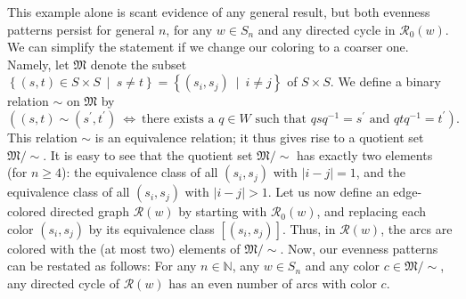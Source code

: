 \documentclass[numbers=enddot,12pt,final,onecolumn,notitlepage,abstracton]{scrartcl}%
\theoremstyle{definition}
\begin{document}
This example alone is scant evidence of any general result, but both evenness
patterns persist for general $n$, for any $w\in S_{n}$ and any directed cycle
in $\mathcal{R}_{0}\left(  w\right)  $. We can simplify the statement if we
change our coloring to a coarser one. Namely, let $\mathfrak{M}$ denote the
subset $\left\{  \left(  s,t\right)  \in S\times S\ \mid\ s\neq t\right\}
=\left\{  \left(  s_{i},s_{j}\right)  \ \mid\ i\neq j\right\}  $ of $S\times
S$. We define a binary relation $\sim$ on $\mathfrak{M}$ by%
\[
\left(  \left(  s,t\right)  \sim\left(  s^{\prime},t^{\prime}\right)
\ \Longleftrightarrow\ \text{there exists a }q\in W\text{ such that }%
qsq^{-1}=s^{\prime}\text{ and }qtq^{-1}=t^{\prime}\right)  .
\]
This relation $\sim$ is an equivalence relation; it thus gives rise to a
quotient set $\mathfrak{M}/\sim$. It is easy to see that the quotient set
$\mathfrak{M}/\sim$ has exactly two elements (for $n\geq4$): the equivalence
class of all $\left(  s_{i},s_{j}\right)  $ with $\left\vert i-j\right\vert
=1$, and the equivalence class of all $\left(  s_{i},s_{j}\right)  $ with
$\left\vert i-j\right\vert >1$. Let us now define an edge-colored directed
graph $\mathcal{R}\left(  w\right)  $ by starting with $\mathcal{R}_{0}\left(
w\right)  $, and replacing each color $\left(  s_{i},s_{j}\right)  $ by its
equivalence class $\left[  \left(  s_{i},s_{j}\right)  \right]  $. Thus, in
$\mathcal{R}\left(  w\right)  $, the arcs are colored with the (at most two)
elements of $\mathfrak{M}/\sim$. Now, our evenness patterns can be restated as
follows: For any $n\in\mathbb{N}$, any $w\in S_{n}$ and any color
$c\in\mathfrak{M}/\sim$, any directed cycle of $\mathcal{R}\left(  w\right)  $
has an even number of arcs with color $c$.
\end{document}
